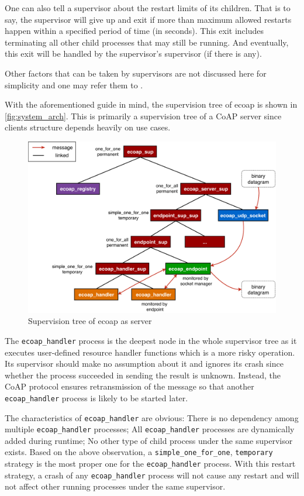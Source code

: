 One can also tell a supervisor about the restart limits of its children. That is to say, the supervisor will give up and exit if more than maximum allowed restarts happen within a specified period of time (in seconds). This exit includes terminating all other child processes that may still be running. And eventually, this exit will be handled by the supervisor's supervisor (if there is any).

Other factors that can be taken by supervisors are not discussed here for simplicity and one may refer them to \autocite{otp_supervisor}.

With the aforementioned guide in mind, the supervision tree of ecoap is shown in \autoref{fig:system_arch}. This is primarily a supervision tree of a CoAP server since clients structure depends heavily on use cases. 

\begin{figure}[!htbp]
\centering
\includegraphics[scale = 0.7]{system_arch_vertical}
\caption{Supervision tree of ecoap as server}
\label{fig:system_arch}
\end{figure}

The \verb|ecoap_handler| process is the deepest node in the whole supervisor tree as it executes user-defined resource handler functions which is a more risky operation. Its supervisor should make no assumption about it and ignores its crash since whether the process succeeded in sending the result is unknown. Instead, the CoAP protocol ensures retransmission of the message so that another \verb|ecoap_handler| process is likely to be started later. 

The characteristics of \verb|ecoap_handler| are obvious: There is no dependency among multiple \verb|ecoap_handler| processes; All \verb|ecoap_handler| processes are dynamically added during runtime; No other type of child process under the same supervisor exists. Based on the above observation, a \verb|simple_one_for_one|, \verb|temporary| strategy is the most proper one for the \verb|ecoap_handler| process. With this restart strategy, a crash of any \verb|ecoap_handler| process will not cause any restart and will not affect other running processes under the same supervisor.

